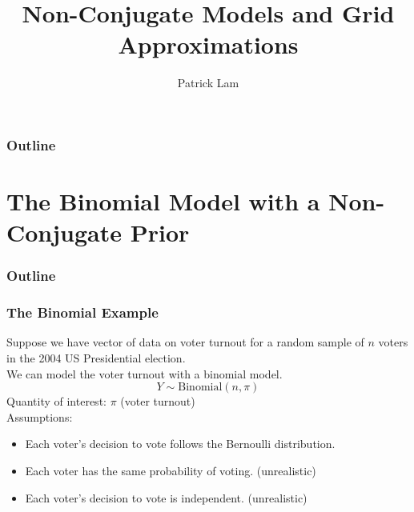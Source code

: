 \documentclass[handout]{beamer}
\author{Patrick Lam}
\title{Non-Conjugate Models and Grid Approximations}
\date{}
\begin{document}
\newcommand{\red}{\textcolor{red}}
\newcommand{\blue}{\textcolor{blue}}
\newcommand{\purple}{\textcolor{purple}}

\frame{\titlepage}

\begin{frame}
\frametitle{Outline}
\tableofcontents
\end{frame}

\section{The Binomial Model with a Non-Conjugate Prior}

\begin{frame}
\frametitle{Outline}
\tableofcontents[currentsection]
\end{frame}

\begin{frame}
\frametitle{The Binomial Example}
\pause
Suppose we have vector of data on voter turnout for a random sample of $n$
voters in the 2004 US Presidential election.   \\
\pause
\bigskip
We can model the voter turnout with a binomial model.\\
\pause
\begin{equation*}
Y \sim \mathrm{Binomial}(n, \pi)
\end{equation*}
\pause
\bigskip
Quantity of interest: $\pi$ (voter turnout)\\
\pause
\bigskip
Assumptions:
\pause
\begin{itemize}
\item Each voter's decision to vote follows the Bernoulli
distribution. \pause
\item Each voter has the same probability of voting.  \pause
(unrealistic) \pause
\item Each voter's decision to vote is independent.  \pause (unrealistic)
\end{itemize}
\end{frame}
\end{document}
